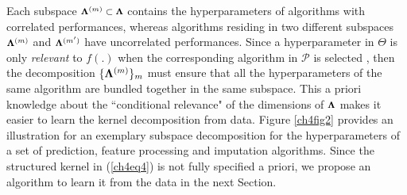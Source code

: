 \documentclass [PhD] {uclathes}
\begin{document}
Each subspace $\mbox{\footnotesize ${\bf \Lambda}^{(m)} \subset {\bf \Lambda}$}$ contains the hyperparameters of algorithms with correlated performances, whereas algorithms residing in two different subspaces $\mbox{\footnotesize ${\bf \Lambda}^{(m)}$}$ and $\mbox{\footnotesize ${\bf \Lambda}^{(m^{\prime})}$}$ have uncorrelated performances. Since a hyperparameter in \mbox{\footnotesize $\Theta$} is only {\it relevant} to $f(.)$ when the corresponding algorithm in \mbox{\footnotesize $\mathcal{P}$} is selected \cite{hutter2009paramils}, then the decomposition \mbox{\footnotesize $\{{\bf \Lambda}^{(m)}\}_m$} must ensure that all the hyperparameters of the same algorithm are bundled together in the same subspace. This a priori knowledge about the ``conditional relevance" of the dimensions of $\mbox{\footnotesize ${\bf \Lambda}$}$ makes it easier to learn the kernel decomposition from data. Figure \ref{ch4fig2} provides an illustration for an exemplary subspace decomposition for the hyperparameters of a set of prediction, feature processing and imputation algorithms. Since the structured kernel in (\ref{ch4eq4}) is not fully specified a priori, we propose an algorithm to learn it from the data in the next Section.  
\end{document}
